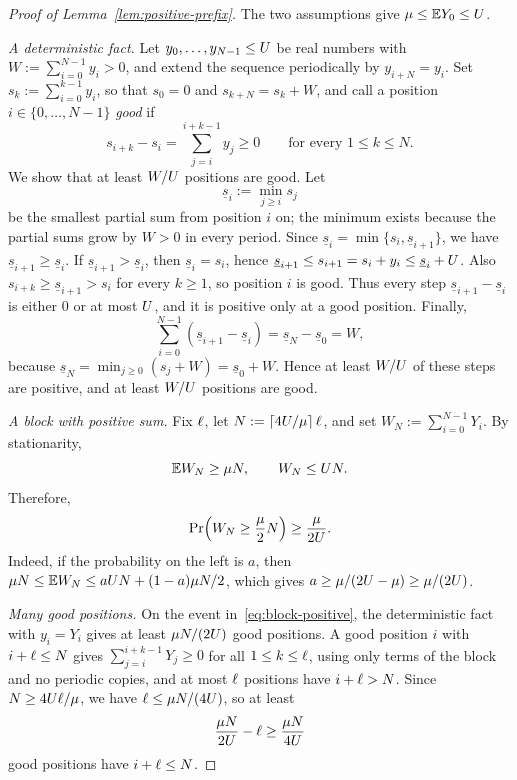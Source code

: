 \begin{proof}[Proof of Lemma~\ref{lem:positive-prefix}]
The two assumptions give \(\mu\le\mathbb{E} Y_0\le U\).

\emph{A deterministic fact.} Let \(y_0,\ldots,y_{N-1}\le U\) be real numbers
with \(W:=\sum_{i=0}^{N-1}y_i>0\), and extend the sequence periodically by
\(y_{i+N}=y_i\). Set \(s_k:=\sum_{i=0}^{k-1}y_i\), so that \(s_0=0\) and
\(s_{k+N}=s_k+W\), and call a position \(i\in\{0,\ldots,N-1\}\) \emph{good} if
\[
  s_{i+k}-s_i=\sum_{j=i}^{i+k-1}y_j\ge0
  \qquad\text{for every }1\le k\le N.
\]
We show that at least \(W/U\) positions are good. Let
\[
  \underline{s}_i:=\min_{j\ge i}s_j
\]
be the smallest partial sum from position \(i\) on; the minimum exists because
the partial sums grow by \(W>0\) in every period. Since
\(\underline{s}_i=\min\{s_i,\underline{s}_{i+1}\}\), we have
\(\underline{s}_{i+1}\ge \underline{s}_i\). If
\(\underline{s}_{i+1}>\underline{s}_i\), then \(\underline{s}_i=s_i\), hence
\(\underline{s}_{i+1}\le s_{i+1}=s_i+y_i\le\underline{s}_i+U\). Also
\(s_{i+k}\ge \underline{s}_{i+1}>s_i\) for every \(k\ge1\), so position \(i\) is
good. Thus every step \(\underline{s}_{i+1}-\underline{s}_i\) is either \(0\)
or at most \(U\), and it is positive only at a good position. Finally,
\[
  \sum_{i=0}^{N-1}(\underline{s}_{i+1}-\underline{s}_i)
  =\underline{s}_N-\underline{s}_0=W,
\]
because \(\underline{s}_N=\min_{j\ge0}(s_j+W)=\underline{s}_0+W\). Hence at
least \(W/U\) of these steps are positive, and at least \(W/U\) positions
are good.

\emph{A block with positive sum.} Fix \(\ell\), let
\(N:=\lceil 4U/\mu\rceil\,\ell\), and set
\(W_N:=\sum_{i=0}^{N-1}Y_i\). By stationarity,
\[
  \mathbb{E} W_N\ge\mu N,
  \qquad
  W_N\le U N.
\]
Therefore,
\begin{equation}\label{eq:block-positive}
  \Prx{W_N\ge\frac\drift2N}
  \ge\frac{\drift}{2\ubd}.
\end{equation}
Indeed, if the probability on the left is \(a\), then
\(\mu N\le\mathbb{E} W_N\le aU N+(1-a)\mu N/2\), which gives
\(a\ge\mu/(2U-\mu)\ge\mu/(2U)\).

\emph{Many good positions.} On the event in~\eqref{eq:block-positive}, the
deterministic fact with \(y_i=Y_i\) gives at least \(\mu N/(2U)\) good
positions. A good position \(i\) with \(i+\ell\le N\) gives
\(\sum_{j=i}^{i+k-1}Y_j\ge0\) for all \(1\le k\le\ell\), using only terms of
the block and no periodic copies, and at most \(\ell\) positions have
\(i+\ell>N\). Since \(N\ge 4U\ell/\mu\), we have
\(\ell\le\mu N/(4U)\), so at least
\[
  \frac{\mu N}{2U}-\ell\ge\frac{\mu N}{4U}
\]
good positions have \(i+\ell\le N\).


\end{proof}
